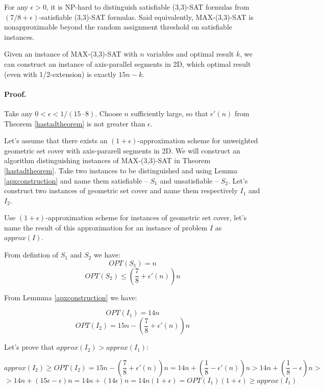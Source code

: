 \begin{tw}{
	\label{hastadtheorem}
	\textbf{\cite{hastad}}
	
	For any $\epsilon > 0$, it is NP-hard to distinguish satisfiable
	(3,3)-SAT formulas from
	\linebreak\mbox{$(7/8 + \epsilon)$-satisfiable}
	(3,3)-SAT formulas. Said equivalently, MAX-(3,3)-SAT
	is nonapproximable beyond the random assignment threshold
	on satisfiable instances.
}\end{tw}

\begin{lemma}{
	\label{apxconstruction}
	Given an instance of  MAX-(3,3)-SAT 
	with $n$ variables and optimal result $k$,
	we can construct an instance of axis-parallel segments in 2D,
	which optimal result (even with 1/2-extension) is exactly $15n - k$.
}\end{lemma}

\paragraph{Proof.}
Take any $0 < \epsilon < 1/(15 \cdot 8)$.
Choose $n$ sufficiently large, so that $\epsilon'(n)$ from
Theorem \ref{hastadtheorem}
is not greater than $\epsilon$.

Let's assume that there exists an $(1+\epsilon)$-approximation scheme
for unweighted geometric set cover with axis-pararell segments in 2D.
We will construct an algorithm distinguishing instances of
MAX-(3,3)-SAT
in Theorem \ref{hastadtheorem}.
Take two instances to be distinguished and using
Lemma \ref{apxconstruction}
and name them satisfiable -- $S_1$ and unsatisfiable -- $S_2$.
Let's construct two instances of geometric set cover
and name them respectively $I_1$ and $I_2$.

Use $(1+\epsilon)$-approximation scheme for instances of geometric
set cover, let's name the result of this approximation
for an instance of problem $I$ as $approx(I)$.

From defintion of $S_1$ and $S_2$ we have:
$$OPT(S_1) = n$$
$$OPT(S_2) \le (\frac{7}{8} + \epsilon'(n))n$$

From Lemmma \ref{apxconstruction} we have:

$$OPT(I_1) = 14n$$
$$OPT(I_2) = 15n - (\frac{7}{8} + \epsilon'(n))n$$

Let's prove that $approx(I_2) > approx(I_1)$:

$$approx(I_2) \ge OPT(I_2) = 15n - (\frac{7}{8} + \epsilon'(n))n
	= 14n + (\frac{1}{8} - \epsilon'(n))n
	> 14n + (\frac{1}{8} - \epsilon)n > $$
$$	> 14n + (15\epsilon - \epsilon)n
	= 14n + (14\epsilon)n
	= 14n(1+\epsilon)
	= OPT(I_1)(1+\epsilon) \ge approx(I_1)$$ 




